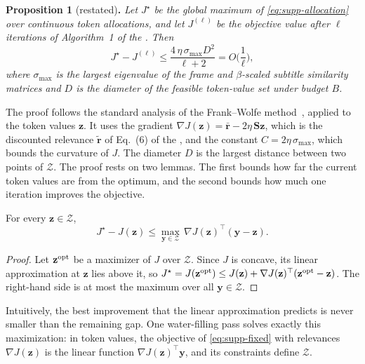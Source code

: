 \smallskip
\noindent\textbf{Proposition 1} (restated)\textbf{.} \textit{Let $J^\star$ be the global maximum of \cref{eq:supp-allocation} over continuous token allocations, and let $J^{(\ell)}$ be the objective value after $\ell$ iterations of Algorithm~1 of the \mainpaper. Then}
\begin{equation}
  J^\star-J^{(\ell)}\le\frac{4\,\eta\,\sigma_{\max}D^2}{\ell+2}=O\Big(\frac{1}{\ell}\Big) ,
\label{eq:supp-rate}
\end{equation}
\textit{where $\sigma_{\max}$ is the largest eigenvalue of the frame and $\beta$-scaled subtitle similarity matrices and $D$ is the diameter of the feasible token-value set under budget $B$.}

\smallskip
The proof follows the standard analysis of the Frank--Wolfe method~\cite{jaggi2013}, applied to the token values $\mathbf z$. It uses the gradient $\nabla J(\mathbf z)=\bar{\mathbf r}-2\eta\,\mathbf S\mathbf z$, which is the discounted relevance $\tilde{\mathbf r}$ of Eq.~(6) of the \mainpaper, and the constant $C=2\eta\,\sigma_{\max}$, which bounds the curvature of $J$. The diameter $D$ is the largest distance between two points of $\mathcal Z$. The proof rests on two lemmas. The first bounds how far the current token values are from the optimum, and the second bounds how much one iteration improves the objective.

\begin{lemma}
\label{lem:gap}
For every $\mathbf z\in\mathcal Z$,
\begin{equation}
  J^\star-J(\mathbf z)\le\max_{\mathbf y\in\mathcal Z}\,\nabla J(\mathbf z)^{\top}(\mathbf y-\mathbf z) .
\label{eq:supp-lem-gap}
\end{equation}
\end{lemma}
\begin{proof}
Let $\mathbf z^{\rm opt}$ be a maximizer of $J$ over $\mathcal Z$. Since $J$ is concave, its linear approximation at $\mathbf z$ lies above it, so $J^\star=J(\mathbf z^{\rm opt})\le J(\mathbf z)+\nabla J(\mathbf z)^{\top}(\mathbf z^{\rm opt}-\mathbf z)$. The right-hand side is at most the maximum over all $\mathbf y\in\mathcal Z$.
\end{proof}

\noindent Intuitively, the best improvement that the linear approximation predicts is never smaller than the remaining gap. One water-filling pass solves exactly this maximization: in token values, the objective of \cref{eq:supp-fixed} with relevances $\nabla J(\mathbf z)$ is the linear function $\nabla J(\mathbf z)^{\top}\mathbf y$, and its constraints define $\mathcal Z$.

